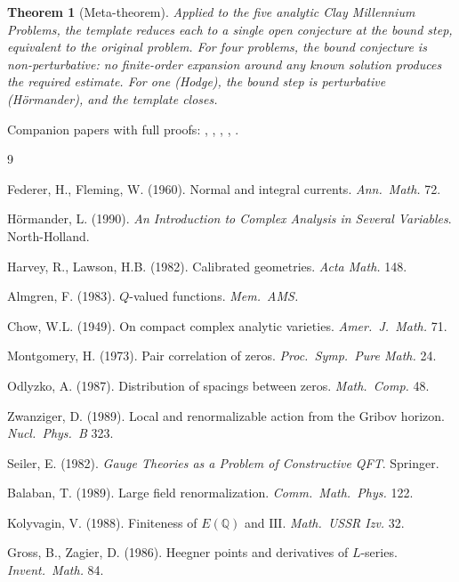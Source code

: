 \documentclass[12pt]{article}
\newtheorem{theorem}{Theorem}
\theoremstyle{remark}
\begin{document}
\begin{theorem}[Meta-theorem]\label{thm:meta}
Applied to the five analytic Clay Millennium Problems, the template reduces each
to a single open conjecture at the bound step, equivalent to the original problem.
For four problems, the bound conjecture is non-perturbative: no finite-order
expansion around any known solution produces the required estimate. For one
(Hodge), the bound step is perturbative (Hörmander), and the template closes.
\end{theorem}

Companion papers with full proofs: \cite{hodge2}, \cite{ym2}, \cite{bsd2},
\cite{ns2}, \cite{hard}.

\begin{thebibliography}{9}

Federer, H., Fleming, W. (1960).
Normal and integral currents. \textit{Ann.\ Math.} 72.

H\"ormander, L. (1990).
\textit{An Introduction to Complex Analysis in Several Variables}. North-Holland.

Harvey, R., Lawson, H.B. (1982).
Calibrated geometries. \textit{Acta Math.} 148.

Almgren, F. (1983).
$Q$-valued functions. \textit{Mem.\ AMS.}

Chow, W.L. (1949).
On compact complex analytic varieties. \textit{Amer.\ J.\ Math.} 71.

Montgomery, H. (1973).
Pair correlation of zeros. \textit{Proc.\ Symp.\ Pure Math.} 24.

Odlyzko, A. (1987).
Distribution of spacings between zeros. \textit{Math.\ Comp.} 48.

Zwanziger, D. (1989).
Local and renormalizable action from the Gribov horizon.
\textit{Nucl.\ Phys.\ B} 323.

Seiler, E. (1982).
\textit{Gauge Theories as a Problem of Constructive QFT}. Springer.

Balaban, T. (1989).
Large field renormalization. \textit{Comm.\ Math.\ Phys.} 122.

Kolyvagin, V. (1988).
Finiteness of $E(\mathbb{Q})$ and $\mathrm{III}$. \textit{Math.\ USSR Izv.} 32.

Gross, B., Zagier, D. (1986).
Heegner points and derivatives of $L$-series. \textit{Invent.\ Math.} 84.


\end{thebibliography}
\end{document}

